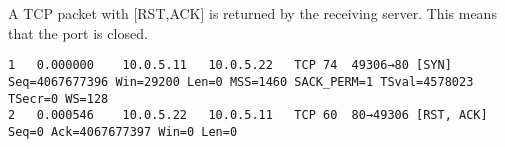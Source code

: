 A TCP packet with [RST,ACK] is returned by the receiving server. This means that the port is closed.

\begin{lstlisting}
1	0.000000	10.0.5.11	10.0.5.22	TCP	74	49306→80 [SYN] Seq=4067677396 Win=29200 Len=0 MSS=1460 SACK_PERM=1 TSval=4578023 TSecr=0 WS=128
2	0.000546	10.0.5.22	10.0.5.11	TCP	60	80→49306 [RST, ACK] Seq=0 Ack=4067677397 Win=0 Len=0
\end{lstlisting}